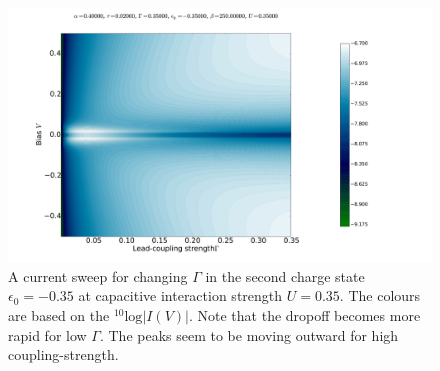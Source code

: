\begin{figure}[h]
    \centering
     \includegraphics[height=.38\textheight]{pdf/gammascan.pdf}
    \caption{A current sweep for changing $\Gamma$ in the second charge state $\epsilon_0 = -0.35$ at capacitive interaction strength $U=0.35$. The colours are based on the $^{10}\text{log}\left|I(V)\right|$. Note that the dropoff becomes more rapid for low $\Gamma$. The peaks seem to be moving outward for high coupling-strength.}
    \label{fig:gammascan}
\end{figure}



\clearpage
{}